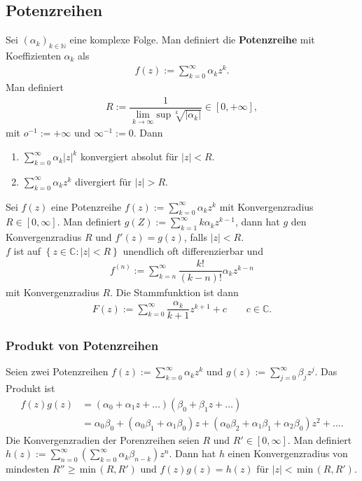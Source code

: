 \documentclass[a4paper,12pt]{article}
\numberwithin{equation}{section}
\begin{document}
\subsection{Potenzreihen}
Sei $\left(\alpha _k\right)_{k \in \mathbb{N}}$ eine komplexe Folge. Man definiert die \textbf{Potenzreihe} mit Koeffizienten $\alpha _k$ als
\begin{align} 
        f\left(z\right):=\sum_{k=0}^{\infty}\alpha _kz^k
.\end{align} 
Man definiert 
\begin{align} 
        R:=\dfrac{1}{\lim_{k\rightarrow \infty}\text{sup}\,\sqrt[k]{|\alpha _k|}} \in [0,+\infty]
,\end{align} 
mit $o^{-1}:=+\infty$ und $\infty^{-1}:=0$. Dann
\begin{enumerate}[label=\roman*)]
        \item $\sum_{k=0}^{\infty}\alpha _k|z|^k$ konvergiert absolut für $|z|<R$.
        \item $\sum_{k=0}^{\infty}\alpha _kz^k$ divergiert für $|z|>R$.
\end{enumerate}
Sei $f\left(z\right)$ eine Potenzreihe $f\left(z\right):=\sum_{k=0}^{\infty}\alpha _kz^k$ mit Konvergenzradius $R \in \left[0,\infty\right]$. Man definiert $g\left(Z\right):=\sum_{k=1}^{\infty}k\alpha _kz^{k-1}$, dann hat $g$ den Konvergenzradius $R$ und $f'\left(z\right)=g\left(z\right)$, falls $|z|<R$.\\\indent
$f$ ist auf $\left\{z \in \mathbb{C}:|z|<R\right\}$ unendlich oft differenzierbar und
\begin{align} 
        f^{\left(n\right)}:=\sum_{k=n}^{\infty}\dfrac{k!}{\left(k-n\right)!}\alpha _kz^{k-n}
\end{align} 
mit Konvergenzradius $R$. Die Stammfunktion ist dann
\begin{align} 
        F\left(z\right):=\sum_{k=0}^{\infty}\dfrac{\alpha _k}{k+1}z^{k+1}+c\qquad c  \in \mathbb{C}
.\end{align} 

\subsubsection{Produkt von Potenzreihen}
Seien zwei Potenzreihen $f\left(z\right):=\sum_{k=0}^{\infty}\alpha _kz^k$ und $g\left(z\right):=\sum_{j=0}^{\infty}\beta _jz^j$. Das Produkt ist
\begin{align} 
        f\left(z\right)g\left(z\right)&=\left(\alpha _0+\alpha _1z+\hdots \right)\left(\beta _0+\beta _1z+\hdots \right)\\
                                      &=\alpha _0\beta _0+\left(\alpha _0\beta _1+\alpha _1\beta _0\right)z+\left(\alpha _0\beta _2+\alpha _1\beta _1+\alpha _2\beta _0\right)z^2+\hdots 
.\end{align} 
Die Konvergenzradien der Porenzreihen seien $R$ und $R' \in \left[0,\infty\right]$. Man definiert $h\left(z\right):=\sum_{n=0}^{\infty}\left(\sum_{k=0}^{\infty}\alpha _k\beta _{n-k}\right)z^n$. Dann hat $h$ einen Konvergenzradius von mindesten $R''\geq \,\text{min}\,\left(R,R'\right)$ und $f\left(z\right)g\left(z\right)=h\left(z\right)$ für $|z|<\,\text{min}\,\left(R,R'\right)$.
\end{document}

